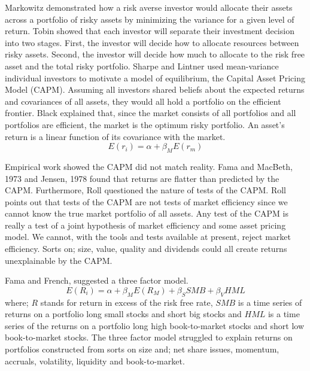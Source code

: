 
Markowitz\cite{markowitz1952portfolio} demonstrated how a risk averse investor 
would allocate their assets across a portfolio of risky assets by minimizing 
the variance for a given level of return.
Tobin\cite{tobin1958liquidity} showed that each investor will separate their 
investment decision into two stages.
First, the investor will decide how to allocate resources between risky assets.
Second, the investor will decide how much to allocate to the risk free asset 
and the total risky portfolio.
Sharpe\cite{sharpe1964capital} and Lintner\cite{lintner1965valuation} used 
mean-variance individual investors to motivate a model of equilibrium, the 
Capital Asset Pricing Model (CAPM).
Assuming all investors shared beliefs about the expected returns and 
covariances of all assets, they would all hold a portfolio on the efficient 
frontier.
Black\cite{black1972capital} explained that, since the market consists of all 
portfolios and all portfolios are efficient, the market is the optimum risky 
portfolio.
An asset's return is a linear function of its covariance with the market.
\begin{equation} \label{eq:mktmodel}
  E(r_i) = \alpha + \beta_M E(r_m)
\end{equation}

Empirical work showed the CAPM did not match reality.
Fama and MacBeth, 1973\cite{fama1973risk} and Jensen, 
1978\cite{jensen1978some} found that returns are flatter than predicted by the 
CAPM.
Furthermore, Roll\cite{roll1977critique} questioned the nature of tests of the 
CAPM. Roll points out that tests of the CAPM are not tests of market 
efficiency 
since we cannot know the true market portfolio of all assets.
Any test of the CAPM is really a test of a joint hypothesis of market 
efficiency and some asset pricing model.
We cannot, with the tools and tests available at present, reject market 
efficiency.
Sorts on; size, value, quality and dividends could all create returns 
unexplainable by the CAPM.

Fama and French\cite{fama1993common}, suggested a three factor model.
\begin{equation} \label{eq:FF3F}
  E(R_i) = \alpha + \beta_M E(R_M) + \beta_S SMB + \beta_V HML
\end{equation}
where; $R$ stands for return in excess of the risk free rate, $SMB$ is a time 
series of returns on a portfolio long small stocks and short big stocks and 
$HML$ is a time series of the returns on a portfolio long high book-to-market 
stocks and short low book-to-market stocks.
The three factor model struggled to explain returns on portfolios constructed 
from sorts on size and; net share issues, momentum, accruals, volatility, 
liquidity and  book-to-market.

